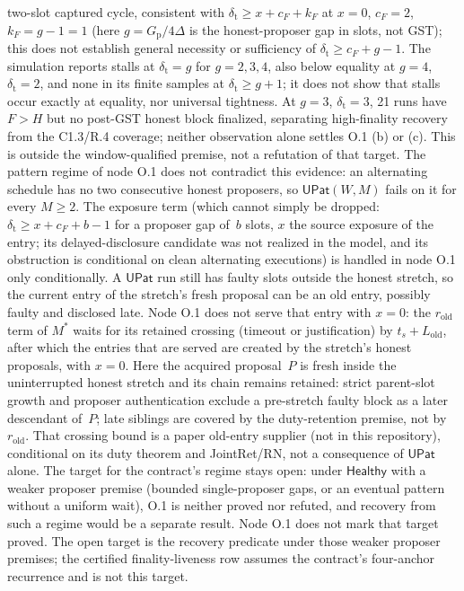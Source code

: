\documentclass{article}
\newcommand{\cF}{c_F}
\begin{document}
two-slot captured cycle, consistent with $\delta_{\mathrm t}\geq x+\cF+k_F$ at
$x=0$, $\cF=2$, $k_F=g-1=1$ (here $g=G_{\mathrm p}/4\Delta$ is the honest-proposer
gap in slots, not GST); this does not establish general necessity or
sufficiency of $\delta_{\mathrm t}\geq\cF+g-1$.  The simulation reports stalls
at $\delta_{\mathrm t}=g$ for $g=2,3,4$, also below equality at $g=4$,
$\delta_{\mathrm t}=2$, and none in its finite samples at
$\delta_{\mathrm t}\geq g+1$; it does not show that stalls occur exactly at
equality, nor universal tightness.  At $g=3$, $\delta_{\mathrm t}=3$, 21 runs
have $F>H$ but no post-GST honest block finalized, separating
high-finality recovery from the C1.3/R.4 coverage; neither observation alone
settles O.1 (b) or (c).  This is outside the window-qualified premise, not a
refutation of that target.  The pattern regime of node O.1 does not
contradict this evidence: an alternating schedule has no two consecutive
honest proposers, so $\mathsf{UPat}(W,M)$ fails on it for every $M\geq2$.
The exposure term (which cannot
simply be dropped: $\delta_{\mathrm t}\geq x+\cF+b-1$ for a proposer gap of~$b$
slots, $x$ the source exposure of the entry; its delayed-disclosure candidate
was not realized in the model, and its obstruction is conditional on clean
alternating executions) is handled in node O.1 only conditionally.  A
$\mathsf{UPat}$ run still has faulty slots outside the honest stretch, so the
current entry of the stretch's fresh proposal can be an old entry, possibly
faulty and disclosed late.  Node O.1 does not serve that entry with $x=0$: the
$r_{\mathrm{old}}$ term of $M^*$ waits for its retained crossing (timeout or
justification) by $t_s+L_{\mathrm{old}}$, after which the entries that are
served are created by the stretch's honest proposals, with $x=0$.  Here the acquired
proposal~$P$ is fresh inside the uninterrupted honest stretch and its chain
remains retained: strict parent-slot growth and proposer authentication
exclude a pre-stretch faulty block as a later descendant of~$P$; late siblings
are covered by the duty-retention premise, not by $r_{\mathrm{old}}$.  That crossing bound is
a paper old-entry supplier (not in this repository), conditional on its duty
theorem and JointRet/RN, not a consequence of $\mathsf{UPat}$ alone.  The target for the contract's regime stays
open: under $\mathsf{Healthy}$ with a weaker proposer premise (bounded
single-proposer gaps, or an eventual pattern without a uniform wait), O.1 is
neither proved nor refuted, and recovery from such a regime would be a separate
result.  Node O.1 does not mark that target proved.  The open target is
the recovery predicate under those weaker proposer premises; the certified
finality-liveness row assumes the contract's four-anchor recurrence and is
not this target.
\end{document}
